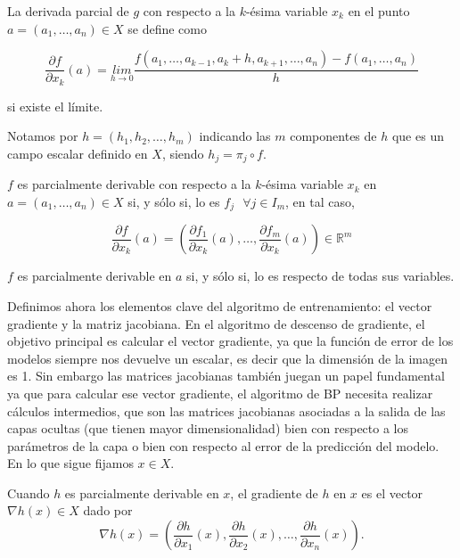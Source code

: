 \begin{definicion}
           

	La derivada parcial de $g$ con respecto a la $k$-ésima variable $x_k$ en el punto $a = (a_1, \ldots, a_n)\in X$ se define como

	$$ \frac{\partial f}{\partial x_k}(a) = \underset{h\rightarrow0}{lim}\frac{f(a_1, \ldots, a_{k-1}, a_k + h, a_{k+1}, \ldots, a_n) - f(a_1, \ldots, a_n)}{h}$$

	si existe el límite.
\end{definicion}

Notamos por $h= \left ( h_1,h_2,\ldots, h_m \right )$ indicando las $m$ componentes de $h$ que es un campo escalar definido en $X$, siendo $h_j=\pi _j \circ f$. 


\begin{definicion}
        $f$ es parcialmente derivable con respecto a la $k$-ésima variable $x_k$ en $a = (a_1, \ldots, a_n)\in X$ si, y sólo si, lo es $f_j \textrm{ } \forall j \in I_m$, en tal caso, 

        $$\frac{\partial f}{\partial x_k}(a) = \left ( \frac{\partial f_1}{\partial x_k}(a), \ldots, \frac{\partial f_m}{\partial x_k}(a) \right ) \in \mathbb{R}^m$$

        $f$ es parcialmente derivable en $a$ si, y sólo si, lo es respecto de todas sus variables.
\end{definicion}


Definimos ahora los elementos clave del algoritmo de entrenamiento: el vector gradiente y la matriz jacobiana. En el algoritmo de descenso de gradiente, el objetivo principal es calcular el vector gradiente, ya que la función de error de los modelos siempre nos devuelve un escalar, es decir que la dimensión de la imagen es 1. Sin embargo las matrices jacobianas también juegan un papel fundamental ya que para calcular ese vector gradiente, el algoritmo de BP necesita realizar cálculos intermedios, que son las matrices jacobianas asociadas a la salida de las capas ocultas (que tienen mayor dimensionalidad) bien con respecto a los parámetros de la capa o bien con respecto al error de la predicción del modelo. En lo que sigue fijamos $x \in X$.

\begin{definicion}
    Cuando $h$ es parcialmente derivable en $x$, el gradiente de $h$ en $x$ es el vector $\nabla h(x) \in X$ dado por 
    $$\nabla h(x) = \left ( \frac{\partial h}{\partial x_1}(x), \frac{\partial h}{\partial x_2}(x), \ldots, \frac{\partial h}{\partial x_n}(x) \right ).$$
\end{definicion}


